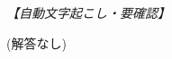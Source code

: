 \documentclass[../../main.tex]{subfiles}
\begin{document}
\begin{oframed}
  
\end{oframed}

\begin{flushright}
  \footnotesize\textit{【自動文字起こし・要確認】}
\end{flushright}

(解答なし)
\end{document}
